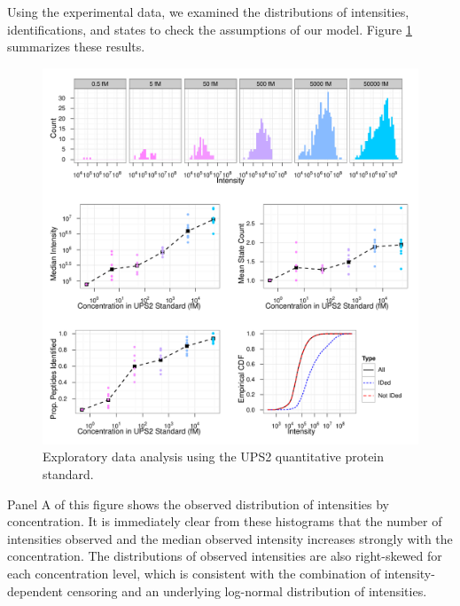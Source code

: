 Using the experimental data, we examined the distributions of intensities, identifications, and states to check the assumptions of our model.
Figure \ref{proteomics:fig:EDA-Figure} summarizes these results.
%
\ifx\nofigures\undefined
\begin{figure}
\centering
\includegraphics[width=\textwidth]{figures/proteomics/New_EDA_Multipanel_Figure}
\caption{Exploratory data analysis using the UPS2 quantitative protein standard.
\label{proteomics:fig:EDA-Figure}}
\end{figure}
\fi
%
Panel A of this figure shows the observed distribution of intensities by concentration.
It is immediately clear from these histograms that the number of intensities observed and the median observed intensity increases strongly with the concentration.
The distributions of observed intensities are also right-skewed for each concentration level, which is consistent with the combination of intensity-dependent censoring and an underlying log-normal distribution of intensities.

